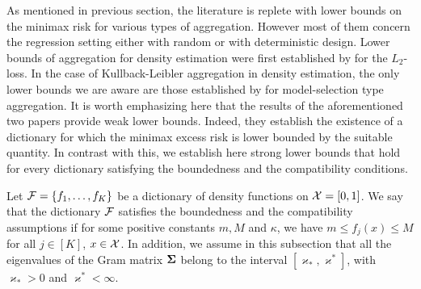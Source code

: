 As mentioned in previous section, the literature is replete with lower bounds on the minimax
risk for various types of aggregation. However most of them concern the regression setting either
with random or with deterministic design. Lower bounds of aggregation for density estimation were
first established by \cite{rigollet:these} for the $L_2$-loss. In the case of Kullback-Leibler
aggregation in density estimation, the only lower bounds we are aware are those established
by \cite{Lecue06} for model-selection type aggregation. It is worth emphasizing here that the
results of the aforementioned two papers provide weak lower bounds. Indeed, they establish
the existence of a dictionary for which the minimax excess risk is lower bounded by the
suitable quantity. In contrast with this, we establish here strong lower bounds that hold
for every dictionary satisfying the boundedness and the compatibility conditions.

Let $\mathcal F = \{f_1,\ldots,f_K\}$ be a dictionary of density functions on $\mathcal X =[0,1]$.
We say that the dictionary $\mathcal F$ satisfies the boundedness and the compatibility assumptions
if for some positive constants $m,M$ and $\kappa$, we have $m \le f_j(x)\le M $ for all
$j\in[K]$, $x\in\mathcal X$. In addition,  we assume in this subsection that all the eigenvalues 
of the Gram matrix $\boldsymbol\Sigma$ belong to the interval $[\varkappa_*,\varkappa^*]$, with 
$\varkappa_*>0$ and $\varkappa^*<\infty$. 


